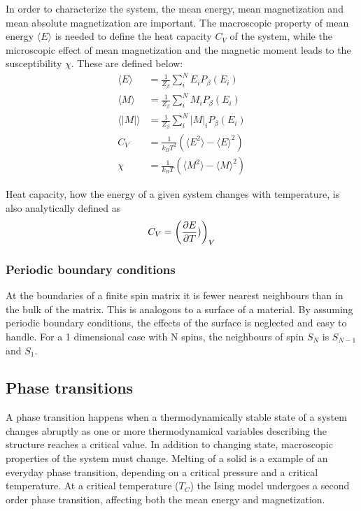 In order to characterize the system, the mean energy, mean magnetization and mean absolute magnetization are important. The macroscopic property of mean energy $ \langle E \rangle $ is needed to define the heat capacity $ C_V$ of the system, while the microscopic effect of mean magnetization and the magnetic moment leads to the susceptibility $ \chi $. These are defined below: 
\begin{align}
\langle E \rangle &= \frac{1}{Z_{\beta}} \sum\limits_{i}^N E_i P_{\beta}(E_i) \label{eq:L2_E}\\
\langle M \rangle &= \frac{1}{Z_{\beta}} \sum\limits_{i}^N M_i P_{\beta}(E_i) \label{eq:L2_M}\\
\langle |M | \rangle &= \frac{1}{Z_{\beta}} \sum\limits_{i}^N |M|_i P_{\beta}(E_i)\\
 C_V &= \frac{1}{k_B T^2} \left( 	\langle E^2 \rangle - \langle E\rangle^2 	\right) \label{eq_C_V_def}\\
\chi &= \frac{1}{k_B T} \left( 	\langle M^2 \rangle - \langle M\rangle^2 	\right)\label{eq_X_def}
\end{align}

Heat capacity, how the energy of a given system changes with temperature, is also analytically defined as \begin{equation}\label{eq_CV_analy}
C_V = \left( \pdv{E}{T})\right)_V
\end{equation}

\subsubsection{Periodic boundary conditions}

At the boundaries of a finite spin matrix it is fewer nearest neighbours than in the bulk of the matrix. This is analogous to a surface of a material. By assuming periodic boundary conditions, the effects of the surface is neglected and easy to handle. For a 1 dimensional case with N spins, the neighbours of spin $ S_N $ is $ S_{N-1} $ and $ S_1 $. 

\subsection{Phase transitions}

A phase transition happens when a thermodynamically stable state of a system changes abruptly as one or more thermodynamical  variables describing the structure reaches a critical value. In addition to changing state, macroscopic properties of the system must change. Melting of a solid is a example of an everyday phase transition, depending on a critical pressure and a critical temperature. At a critical temperature ($ T_C $) the Ising model undergoes a second order phase transition, affecting both the mean energy and magnetization. 


